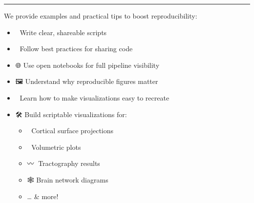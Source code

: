 \documentclass[letterpaper,10pt,english]{jupyterBook}
\begin{document}
\bigskip\hrule\bigskip


\sphinxAtStartPar
We provide examples and practical tips to boost reproducibility:

\begin{DUlineblock}{0em}
\item[] 
\end{DUlineblock}
\begin{itemize}
\item {} 
\sphinxAtStartPar
📝 Write clear, shareable scripts

\item {} 
\sphinxAtStartPar
🌟 Follow best practices for sharing code

\item {} 
\sphinxAtStartPar
🌐 Use open notebooks for full pipeline visibility

\end{itemize}

\begin{DUlineblock}{0em}
\item[] 
\end{DUlineblock}
\begin{itemize}
\item {} 
\sphinxAtStartPar
🖼️ Understand why reproducible figures matter

\item {} 
\sphinxAtStartPar
🔁 Learn how to make visualizations easy to recreate

\item {} 
\sphinxAtStartPar
🛠️ Build scriptable visualizations for:
\begin{itemize}
\item {} 
\sphinxAtStartPar
🧠 Cortical surface projections

\item {} 
\sphinxAtStartPar
🧊 Volumetric plots

\item {} 
\sphinxAtStartPar
〰️🧵 Tractography results

\item {} 
\sphinxAtStartPar
🕸️ Brain network diagrams

\item {} 
\sphinxAtStartPar
… \& more!

\end{itemize}

\end{itemize}
\end{document}
